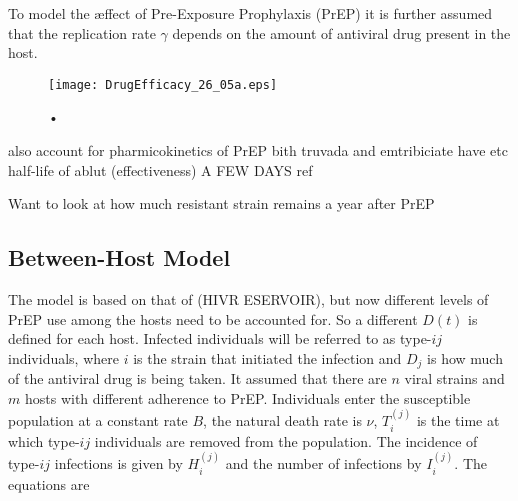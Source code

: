 \documentclass[DIV=15]{scrartcl}
\begin{document}
To model the {\ae}ffect of Pre-Exposure Prophylaxis (PrEP) it is further assumed that the replication rate $\gamma$ depends on the amount of antiviral drug present in the host.

\fi




\begin{figure}[h]
 \begin{center}
 \texttt{[image: DrugEfficacy\_26\_05a.eps]}
 \end{center}
 \caption{•}
 \label{Drug efficacy}
 \end{figure}
 
also account for pharmicokinetics of PrEP bith truvada and emtribiciate have etc half-life of ablut (effectiveness) A  FEW DAYS ref



Want to look  at how much resistant strain remains a year after PrEP


\iffalse
pictures made on  26/05 max values occur at (for strain 1 initial) a=0.01, rL=2 in the active compartment

for the reservoir max occurs at a=1.25e-4 and rL=0.55

now for homeostatic proliferation  the max value in the reservoir is when rho = 0 (just great!) and rL=1.6

in the active compartment it  is rL=1.375 and rho=0.009
\fi


\fi





\subsection{Between-Host Model}





The model is based on that of (HIVR ESERVOIR), but now different levels of PrEP use  among the hosts need to be accounted for. So a different $D(t)$  is defined for each host.   Infected individuals will be referred to as type-$ij$ individuals, where $i$ is the strain that initiated the infection and $D_j$ is how much of the antiviral drug is being taken. It assumed that there are $  n$ viral strains and $m$ hosts with different adherence to PrEP. 
 Individuals enter the susceptible population
at a constant rate $B$, the natural death rate is $\nu$, $T_i^{(j)}$ is  the time at which type-$ij$ individuals are removed from the population. The incidence  of  type-$ij$ infections is given by $H_i^{(j)}$ and the number of infections by 
$I_i^{(j)}$. The equations are
\end{document}
